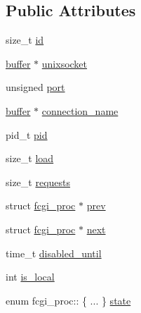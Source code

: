\subsection*{Public Attributes}
\begin{DoxyCompactItemize}
\item 
size\-\_\-t \hyperlink{structfcgi__proc_a8e2a9a017e15271c6d043dd472fb5e82}{id}
\item 
\hyperlink{structbuffer}{buffer} $\ast$ \hyperlink{structfcgi__proc_acd5a01b1989d829f113d420b63e6cf7c}{unixsocket}
\item 
unsigned \hyperlink{structfcgi__proc_a26eb68bd383c86881d334c51bca1ad43}{port}
\item 
\hyperlink{structbuffer}{buffer} $\ast$ \hyperlink{structfcgi__proc_a1e30f9d21ca5cb8753060ece46a72391}{connection\-\_\-name}
\item 
pid\-\_\-t \hyperlink{structfcgi__proc_ac6034bb71c68b16698ba98a75cd355c7}{pid}
\item 
size\-\_\-t \hyperlink{structfcgi__proc_a05b2d9a997b4fd3c8bf3e3895dd9be80}{load}
\item 
size\-\_\-t \hyperlink{structfcgi__proc_a946799f5e5f7acca4b65a0dcfe77130a}{requests}
\item 
struct \hyperlink{structfcgi__proc}{fcgi\-\_\-proc} $\ast$ \hyperlink{structfcgi__proc_aa7ff4495570487c9eabd7ab8e86512d5}{prev}
\item 
struct \hyperlink{structfcgi__proc}{fcgi\-\_\-proc} $\ast$ \hyperlink{structfcgi__proc_ae9352306bd801817471d2916ed9acd72}{next}
\item 
time\-\_\-t \hyperlink{structfcgi__proc_a3fcc7200868e927373032de35766eadf}{disabled\-\_\-until}
\item 
int \hyperlink{structfcgi__proc_acfd6df1d5a250b9b295c0f9e681114ac}{is\-\_\-local}
\item 
enum fcgi\-\_\-proc\-:: \{ ... \}  \hyperlink{structfcgi__proc_a65ab1b24558460a774b89fa6e15819b3}{state}
\end{DoxyCompactItemize}


